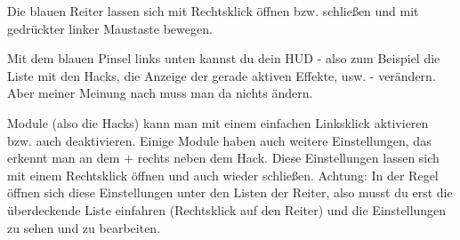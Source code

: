 Die blauen Reiter lassen sich mit Rechtsklick öffnen bzw. schließen und mit gedrückter linker Maustaste bewegen.

Mit dem blauen Pinsel links unten kannst du dein HUD - also zum Beispiel die Liste mit den Hacks, die Anzeige der gerade aktiven Effekte, usw. - verändern. Aber meiner Meinung nach muss man da nichts ändern.

Module (also die Hacks) kann man mit einem einfachen Linksklick aktivieren bzw. auch deaktivieren. Einige Module haben auch weitere Einstellungen, das erkennt man an dem $+$ rechts neben dem Hack. Diese Einstellungen lassen sich mit einem Rechtsklick öffnen und auch wieder schließen. Achtung: In der Regel öffnen sich diese Einstellungen unter den Listen der Reiter, also musst du erst die überdeckende Liste einfahren (Rechtsklick auf den Reiter) und die Einstellungen zu sehen und zu bearbeiten.
